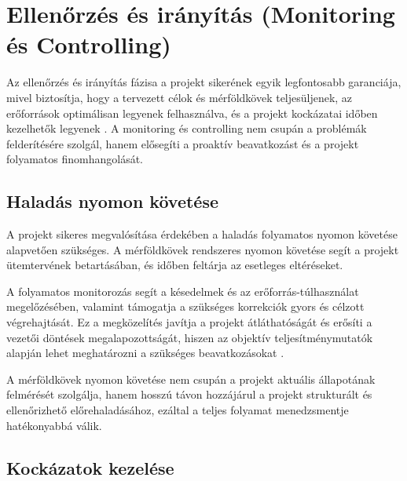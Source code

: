 \section{Ellenőrzés és irányítás (Monitoring és Controlling)}

Az ellenőrzés és irányítás fázisa a projekt sikerének egyik legfontosabb garanciája, mivel biztosítja, 
hogy a tervezett célok és mérföldkövek teljesüljenek, az erőforrások optimálisan legyenek felhasználva, 
és a projekt kockázatai időben kezelhetők legyenek \cite{Hajdu2014,Szalay2018,Kovacs2016,Kaposi2019}. 
A monitoring és controlling nem csupán a problémák felderítésére szolgál, 
hanem elősegíti a proaktív beavatkozást és a projekt folyamatos finomhangolását.

\subsection{Haladás nyomon követése}

A projekt sikeres megvalósítása érdekében a haladás folyamatos nyomon követése alapvetően szükséges.  
A mérföldkövek rendszeres nyomon követése segít a projekt ütemtervének betartásában, és időben feltárja az esetleges eltéréseket.

A folyamatos monitorozás segít a késedelmek és az erőforrás-túlhasználat megelőzésében,  
valamint támogatja a szükséges korrekciók gyors és célzott végrehajtását.  
Ez a megközelítés javítja a projekt átláthatóságát és erősíti a vezetői döntések megalapozottságát,  
hiszen az objektív teljesítménymutatók alapján lehet meghatározni a szükséges beavatkozásokat \cite{Kovacs2016,Kaposi2019}.  

A mérföldkövek nyomon követése nem csupán a projekt aktuális állapotának felmérését szolgálja,  
hanem hosszú távon hozzájárul a projekt strukturált és ellenőrizhető előrehaladásához,  
ezáltal a teljes folyamat menedzsmentje hatékonyabbá válik.

\subsection{Kockázatok kezelése}

